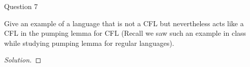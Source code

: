 \begin{solution}{Question 7}\label{ques:7}
    \begin{question}
     Give an example of a language that is not a CFL but nevertheless acts like a CFL in the pumping lemma for CFL (Recall we saw such an example in class while studying pumping lemma for regular languages). 
    \end{question}
    \tcblower{}
    \begin{proof}[Solution]
    
    
    
    \end{proof}
\end{solution}
